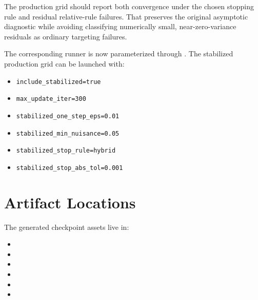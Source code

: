 \documentclass[11pt]{article}
\begin{document}
The production grid should report both convergence under the chosen stopping rule and residual relative-rule failures. That preserves the original asymptotic diagnostic while avoiding classifying numerically small, near-zero-variance residuals as ordinary targeting failures.

The corresponding runner is now parameterized through . The stabilized production grid can be launched with:

\begin{itemize}
  \item \texttt{include\_stabilized=true}
  \item \texttt{max\_update\_iter=300}
  \item \texttt{stabilized\_one\_step\_eps=0.01}
  \item \texttt{stabilized\_min\_nuisance=0.05}
  \item \texttt{stabilized\_stop\_rule=hybrid}
  \item \texttt{stabilized\_stop\_abs\_tol=0.001}
\end{itemize}

\appendix
\section{Artifact Locations}

The generated checkpoint assets live in:

\begin{itemize}
  \item {}
  \item {}
  \item {}
  \item {}
  \item {}
  \item {}
\end{itemize}
\end{document}
